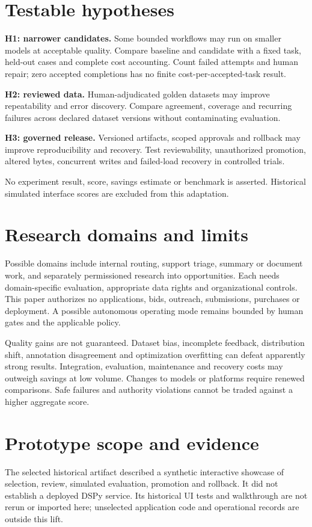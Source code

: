 \documentclass[11pt]{article}
\begin{document}
\section{Testable hypotheses}
\textbf{H1: narrower candidates.} Some bounded workflows may run on smaller models at acceptable quality. Compare baseline and candidate with a fixed task, held-out cases and complete cost accounting. Count failed attempts and human repair; zero accepted completions has no finite cost-per-accepted-task result.

\textbf{H2: reviewed data.} Human-adjudicated golden datasets may improve repeatability and error discovery. Compare agreement, coverage and recurring failures across declared dataset versions without contaminating evaluation.

\textbf{H3: governed release.} Versioned artifacts, scoped approvals and rollback may improve reproducibility and recovery. Test reviewability, unauthorized promotion, altered bytes, concurrent writes and failed-load recovery in controlled trials.

No experiment result, score, savings estimate or benchmark is asserted. Historical simulated interface scores are excluded from this adaptation.
\section{Research domains and limits}
Possible domains include internal routing, support triage, summary or document work, and separately permissioned research into opportunities. Each needs domain-specific evaluation, appropriate data rights and organizational controls. This paper authorizes no applications, bids, outreach, submissions, purchases or deployment. A possible autonomous operating mode remains bounded by human gates and the applicable policy.

Quality gains are not guaranteed. Dataset bias, incomplete feedback, distribution shift, annotation disagreement and optimization overfitting can defeat apparently strong results. Integration, evaluation, maintenance and recovery costs may outweigh savings at low volume. Changes to models or platforms require renewed comparisons. Safe failures and authority violations cannot be traded against a higher aggregate score.
\section{Prototype scope and evidence}
The selected historical artifact described a synthetic interactive showcase of selection, review, simulated evaluation, promotion and rollback. It did not establish a deployed DSPy service. Its historical UI tests and walkthrough are not rerun or imported here; unselected application code and operational records are outside this lift.
\end{document}

